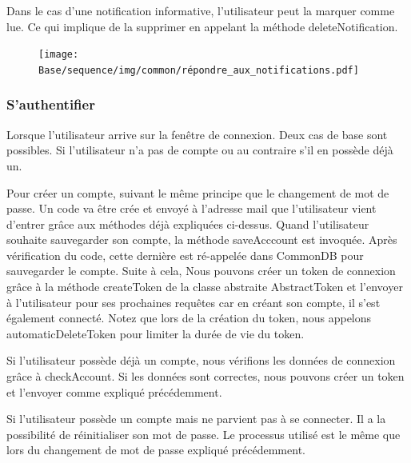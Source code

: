 \begin{flushleft}
Dans le cas d'une notification informative, l'utilisateur peut la marquer comme lue. Ce qui implique de la supprimer en appelant la méthode deleteNotification.
\end{flushleft}

\begin{figure}[h]
\centering
\texttt{[image: Base/sequence/img/common/répondre\_aux\_notifications.pdf]}
\end{figure}

\newpage

\subsubsection{S'authentifier}

\begin{flushleft}
Lorsque l'utilisateur arrive sur la fenêtre de connexion. Deux cas de base sont possibles. Si l'utilisateur n'a pas de compte ou au contraire s'il en possède déjà un.
\end{flushleft}

\begin{flushleft}
Pour créer un compte, suivant le même principe que le changement de mot de passe. Un code va être crée et envoyé à l'adresse mail que l'utilisateur vient d'entrer grâce aux méthodes déjà expliquées ci-dessus. Quand l'utilisateur souhaite sauvegarder son compte, la méthode saveAcccount est invoquée. Après vérification du code, cette dernière est ré-appelée dans CommonDB pour sauvegarder le compte.
\newline
Suite à cela, Nous pouvons créer un token de connexion grâce à la méthode createToken de la classe abstraite AbstractToken et l'envoyer à l'utilisateur pour ses prochaines requêtes car en créant son compte, il s'est également connecté. Notez que lors de la création du token, nous appelons automaticDeleteToken pour limiter la durée de vie du token.
\end{flushleft}

\begin{flushleft}
Si l'utilisateur possède déjà un compte, nous vérifions les données de connexion grâce à checkAccount. Si les données sont correctes, nous pouvons créer un token et l'envoyer comme expliqué précédemment.
\end{flushleft}

\begin{flushleft}
Si l'utilisateur possède un compte mais ne parvient pas à se connecter. Il a la possibilité de réinitialiser son mot de passe. Le processus utilisé est le même que lors du changement de mot de passe expliqué précédemment.
\end{flushleft}

